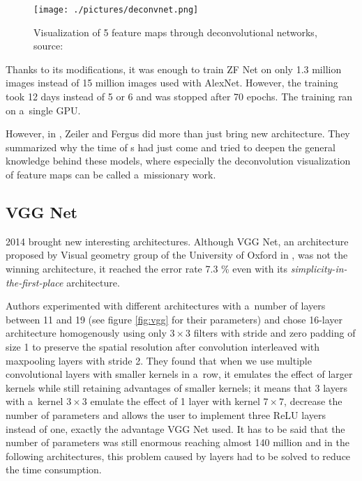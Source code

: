 \begin{figure}[H]
   \centering
	\texttt{[image: ./pictures/deconvnet.png]}
	\caption[Deconvolutional network]{Visualization of 5 feature maps through 
	deconvolutional networks, source: \cite{zf-net}}
      \label{fig:deconvnet}
\end{figure}

Thanks to its modifications, it was enough to train ZF Net on only 1.3 million 
images instead of 15 million images used with AlexNet. However, the training 
took 12 days instead of 5 or 6 and was stopped after 70 epochs. The training
ran on a~single GPU.

However, in \cite{zf-net}, Zeiler and Fergus did more than just bring new 
architecture. They summarized why the time of s had just come and tried
to deepen the general knowledge behind these models, where especially the 
deconvolution visualization of feature maps can be called a~missionary work.

\subsection{VGG Net}
\label{vgg}

 2014 brought new interesting architectures. Although VGG Net, an 
architecture proposed by Visual geometry group of the University of Oxford in 
\cite{vgg}, was not the winning architecture, it reached the error rate 7.3 \% 
even with its \textit{simplicity-in-the-first-place} architecture.

Authors experimented with different architectures with a~number of layers
between 11 and 19 (see figure \ref{fig:vgg} for their parameters) and chose
16-layer architecture homogenously using only $3 \times 3$ filters with stride
and zero padding of size 1 to preserve the spatial resolution after convolution
interleaved with maxpooling layers with stride 2. They found that when we use 
multiple convolutional layers with smaller kernels in a~row, it emulates the 
effect of larger kernels while still retaining advantages of smaller kernels;
it means that 3 layers with a~kernel $3 \times 3$ emulate the effect of 1 layer
with kernel $7 \times 7$, decrease the number of parameters and allows the user
to implement three ReLU layers instead of one, exactly the advantage VGG Net
used. It has to be said that the number of parameters was still enormous
reaching almost 140 million and in the following architectures, this problem
caused by  layers had to be solved to reduce the time consumption.

